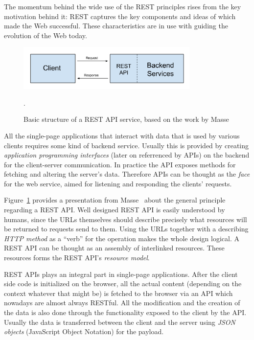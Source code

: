 The momentum behind the wide use of the REST principles rises from the key motivation behind it: REST captures the key components and ideas of which made the Web successful. These characteristics are in use with guiding the evolution of the Web today. \cite{costello_building_2007}

\begin{figure}[t]
\begin{center}
\includegraphics[width=0.8\textwidth]{assets/restapi.png}
\end{center}
\caption{Basic structure of a REST API service, based on the work by Masse\cite{masse_rest_2011}}.
\label{fig:restapi}
\end{figure}

All the single-page applications that interact with data that is used by various clients requires some kind of backend service. Usually this is provided by creating \textit{application programming interfaces} (later on referrenced by APIs) on the backend for the client-server communication. In practice the API exposes methods for fetching and altering the server's data. Therefore APIs can be thought as the \textit{face} for the web service, aimed for listening and responding the clients' requests. \cite{masse_rest_2011}

Figure~\ref{fig:restapi} provides a presentation from Masse~\cite{masse_rest_2011} about the general principle regarding a REST API. Well designed REST API is easily understood by humans, since the URLs themselves should describe precisely what resources will be returned to requests send to them. Using the URLs together with a describing \textit{HTTP method} as a ``verb'' for the operation makes the whole design logical. A REST API can be thought as an assembly of interlinked resources. These resources forms the REST API's \textit{resource model}. \cite{masse_rest_2011}

REST APIs plays an integral part in single-page applications. After the client side code is initialized on the browser, all the actual content (depending on the context whatever that might be) is fetched to the browser via an API which nowadays are almost always RESTful. All the modification and the creation of the data is also done through the functionality exposed to the client by the API. Usually the data is transferred between the client and the server using \textit{JSON objects} (JavaScript Object Notation) for the payload.


